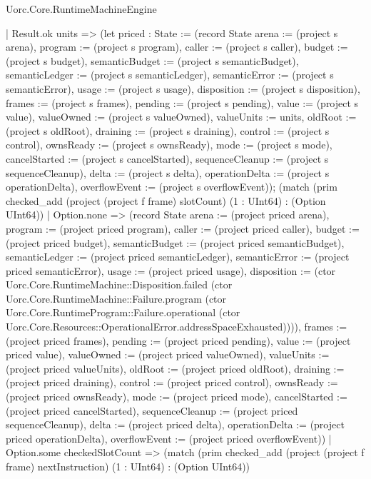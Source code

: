 \begin{lexlean}{Uorc.Core.RuntimeMachineEngine}
\begin{semanticmodule}
{        | Result.ok units => (let priced : State := (record State {arena := (project s arena), program := (project s program), caller := (project s caller), budget := (project s budget), semanticBudget := (project s semanticBudget), semanticLedger := (project s semanticLedger), semanticError := (project s semanticError), usage := (project s usage), disposition := (project s disposition), frames := (project s frames), pending := (project s pending), value := (project s value), valueOwned := (project s valueOwned), valueUnits := units, oldRoot := (project s oldRoot), draining := (project s draining), control := (project s control), ownsReady := (project s ownsReady), mode := (project s mode), cancelStarted := (project s cancelStarted), sequenceCleanup := (project s sequenceCleanup), delta := (project s delta), operationDelta := (project s operationDelta), overflowEvent := (project s overflowEvent)}); (match (prim checked_add (project (project f frame) slotCount) (1 : UInt64) : (Option UInt64))
          | Option.none => (record State {arena := (project priced arena), program := (project priced program), caller := (project priced caller), budget := (project priced budget), semanticBudget := (project priced semanticBudget), semanticLedger := (project priced semanticLedger), semanticError := (project priced semanticError), usage := (project priced usage), disposition := (ctor Uorc.Core.RuntimeMachine::Disposition.failed (ctor Uorc.Core.RuntimeMachine::Failure.program (ctor Uorc.Core.RuntimeProgram::Failure.operational (ctor Uorc.Core.Resources::OperationalError.addressSpaceExhausted)))), frames := (project priced frames), pending := (project priced pending), value := (project priced value), valueOwned := (project priced valueOwned), valueUnits := (project priced valueUnits), oldRoot := (project priced oldRoot), draining := (project priced draining), control := (project priced control), ownsReady := (project priced ownsReady), mode := (project priced mode), cancelStarted := (project priced cancelStarted), sequenceCleanup := (project priced sequenceCleanup), delta := (project priced delta), operationDelta := (project priced operationDelta), overflowEvent := (project priced overflowEvent)})
          | Option.some checkedSlotCount => (match (prim checked_add (project (project f frame) nextInstruction) (1 : UInt64) : (Option UInt64))
}
\end{semanticmodule}
\end{lexlean}

